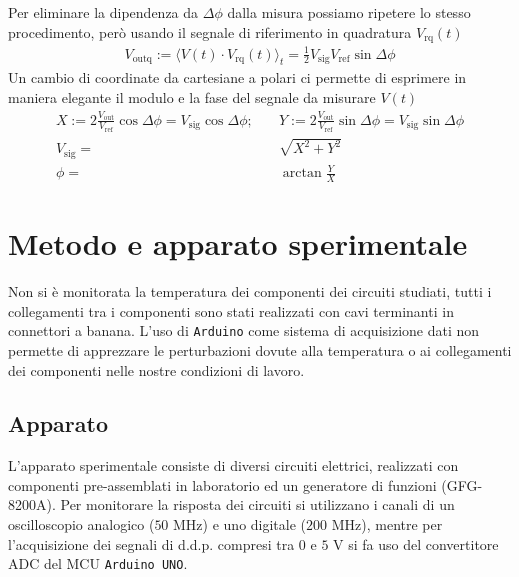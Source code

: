 \documentclass{article}[a4paper, oneside, 11pt]
\begin{document}
Per eliminare la dipendenza da $\Delta \phi$ dalla misura possiamo
ripetere lo stesso procedimento, però usando il segnale di riferimento
in quadratura $V_{\text{rq}}(t)$
\begin{align}
	V_{\text{outq}} := \langle V(t) \cdot V_{\text{rq}} (t) \rangle_t =
	\frac{1}{2} V_{\text{sig}} V_{\text{ref}}\sin{\Delta \phi}
\end{align}
Un cambio di coordinate da cartesiane a polari ci permette di esprimere in
maniera elegante il modulo e la fase del segnale da misurare $V(t)$
\begin{align}
	X := 2 \frac{V_{\text{out}}}{V_{\text{ref}}}\cos{\Delta \phi} =
	V_{\text{sig}}\cos{\Delta \phi}; \quad
	&Y := 2 \frac{V_{\text{out}}}{V_{\text{ref}}}\sin{\Delta \phi} =
	V_{\text{sig}}\sin{\Delta \phi} \\
	V_{\text{sig}} =& \sqrt{X^2 + Y^2}\\
	\phi =& \arctan{\frac{Y}{X}}
\end{align}

\section{Metodo e apparato sperimentale}
Non si è monitorata la temperatura dei componenti dei circuiti studiati,
tutti i collegamenti tra i componenti sono stati realizzati con cavi
terminanti in connettori a banana. L'uso di \verb+Arduino+\cite{arduino}
come sistema di acquisizione dati non permette di apprezzare le perturbazioni
dovute alla temperatura o ai collegamenti dei componenti nelle nostre
condizioni di lavoro.

\subsection{Apparato}
L'apparato sperimentale consiste di diversi circuiti elettrici,
realizzati con componenti pre-assemblati in laboratorio ed un generatore di
funzioni (GFG-8200A).
Per monitorare la risposta dei circuiti si utilizzano i canali di un oscilloscopio
analogico ($50$ MHz) e uno digitale ($200$ MHz), mentre per l'acquisizione dei
segnali di d.d.p. compresi tra $0$ e $5$ V si fa uso del convertitore ADC
del MCU \verb+Arduino UNO+.
\end{document}
